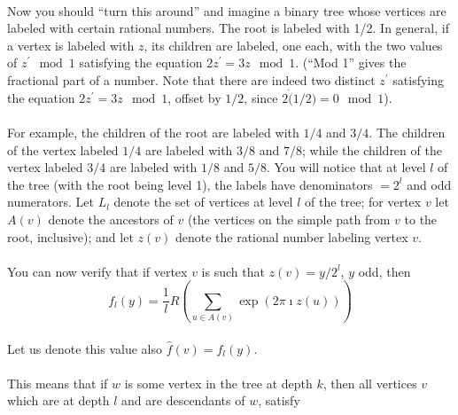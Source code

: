 \documentclass{article}
\begin{document}
\begin{enumerate}[label= (\alph*)]
            \paragraph{}
            Now you should ``turn this around'' and imagine a binary tree whose vertices are labeled
            with certain rational numbers. The root is labeled with 1/2. In general, if a vertex is
            labeled with \(z\), its children are labeled, one each, with the two values of
            \(z^{\prime} \mod{1}\) satisfying the equation \(2z^{\prime} = 3 z \mod{1}\). (``Mod 1''
            gives the fractional part of a number. Note that there are indeed two distinct
            \(z^{\prime}\) satisfying the equation \(2z^{\prime} = 3z \mod{1}\), offset by \(1/2\),
            since \(2 \dot (1/2) = 0 \mod{1}\)).
            \paragraph{}
            For example, the children of the root are labeled with \(1/4\) and \(3/4\). The children
            of the vertex labeled \(1/4\) are labeled with \(3/8\) and \(7/8\); while the children
            of the vertex labeled \(3/4\) are labeled with \(1/8\) and \(5/8\). You will notice that
            at level \(l\) of the tree (with the root being level 1), the labels have denominators
            \(= 2^l\) and odd numerators. Let \(L_l\) denote the set of vertices at level \(l\) of
            the tree; for vertex \(v\) let \(A(v)\) denote the ancestors of \(v\) (the vertices on
            the simple path from \(v\) to the root, inclusive); and let \(z(v)\) denote the rational
            number labeling vertex \(v\).
            \paragraph{}
            You can now verify that if vertex \(v\) is such that \(z(v) = y/2^l\), \(y\) odd, then
            \[f_l (y) = \frac{1}{l} R (\sum_{u\in A(v)}^{} \exp{(2 \pi \imath z(u))})\]
            \paragraph{}
            Let us denote this value also \(\hat{f}(v) = f_l (y)\).
            \paragraph{}
            This means that if \(w\) is some vertex in the tree at depth \(k\), then all vertices
            \(v\) which are at depth \(l\) and are descendants of \(w\), satisfy


\end{enumerate}
\end{document}
